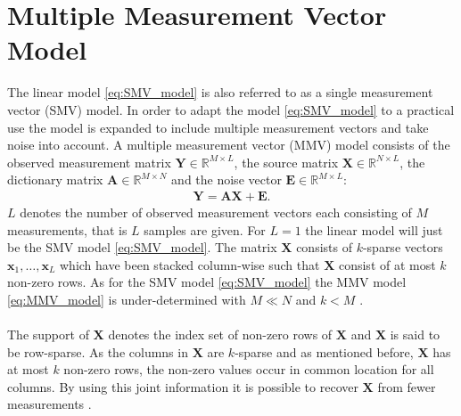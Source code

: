 \section{Multiple Measurement Vector Model}\label{sec:MMV}
The linear model \eqref{eq:SMV_model} is also referred to as a single measurement vector (SMV) model. In order to adapt the model \eqref{eq:SMV_model} to a practical use the model is expanded to include multiple measurement vectors and take noise into account. A multiple measurement vector (MMV) model consists of the observed measurement matrix $\mathbf{Y} \in \mathbb{R}^{M \times L}$, the source matrix $\mathbf{X} \in \mathbb{R}^{N \times L}$, the dictionary matrix $\mathbf{A} \in \mathbb{R}^{M \times N}$ and the noise vector $\textbf{E} \in \mathbb{R}^{M \times L}$:
\begin{align}\label{eq:MMV_model}
\mathbf{Y} = \mathbf{AX}+\textbf{E}.
\end{align}
$L$ denotes the number of observed measurement vectors each consisting of $M$ measurements, that is $L$ samples are given. For $L = 1$ the linear model will just be the SMV model \eqref{eq:SMV_model}. The matrix $\mathbf{X}$ consists of $k$-sparse vectors $\mathbf{x}_1, \dots, \mathbf{x}_L$ which have been stacked column-wise such that $\mathbf{X}$ consist of at most $k$ non-zero rows. As for the SMV model \eqref{eq:SMV_model} the MMV model \eqref{eq:MMV_model} is under-determined with $M \ll N$ and $k < M$ \cite[p. 42]{CS}.
\\ \\
The support of $\mathbf{X}$ denotes the index set of non-zero rows of $\mathbf{X}$ and $\mathbf{X}$ is said to be row-sparse. As the columns in $\mathbf{X}$ are $k$-sparse and as mentioned before, $\mathbf{X}$ has at most $k$ non-zero rows, the non-zero values occur in common location for all columns. By using this joint information it is possible to recover $\mathbf{X}$ from fewer measurements \cite[p. 43]{CS}.

